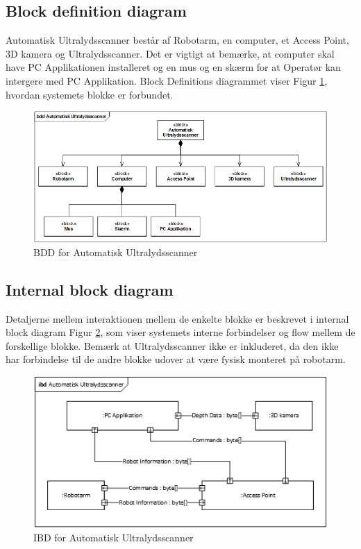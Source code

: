 \subsection{Block definition diagram}
Automatisk Ultralydsscanner består af Robotarm, en computer, et Access Point, 3D kamera og Ultralydsscanner. Det er vigtigt at bemærke, at computer skal have PC Applikationen installeret og en mus og en skærm for at Operatør kan intergere med PC Applikation. Block Definitions diagrammet viser Figur \ref{BDD}, hvordan systemets blokke er forbundet. 

\begin{figure}[H]
    \centering
    \includegraphics[width=1\textwidth]{figurer/d/Design/BDD}
    \caption{BDD for Automatisk Ultralydsscanner}
    \label{BDD}
\end{figure}

\subsection{Internal block diagram}
Detaljerne mellem interaktionen mellem de enkelte blokke er beskrevet i internal block diagram Figur \ref{IBD}, som viser systemets interne forbindelser og flow mellem de forskellige blokke. Bemærk at Ultralydsscanner ikke er inkluderet, da den ikke har forbindelse til de andre blokke udover at være fysisk monteret på robotarm. 

\begin{figure}[H]
    \centering
    \includegraphics[width=1\textwidth]{figurer/d/Design/IBD}
    \caption{IBD for Automatisk Ultralydsscanner}
    \label{IBD}
\end{figure}

